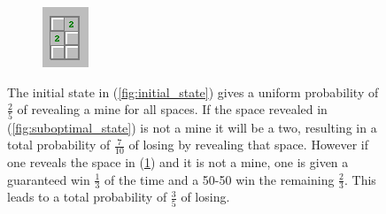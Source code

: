 \documentclass[letterpaper]{article}
\begin{document}
\begin{figure}[t]
\begin{subfigure}[b]{0.3\columnwidth}
	\includegraphics[width=\columnwidth]{tie breaker 3}
	\caption{\label{fig:optimal_state}}
\end{subfigure}
\label{fig:tie_breaker}
\caption{The initial state in (\ref{fig:initial_state}) gives a uniform probability of $\frac25$ of revealing a mine for all spaces.  If the space revealed in (\ref{fig:suboptimal_state}) is not a mine it will be a two, resulting in a total probability of $\frac{7}{10}$ of losing by revealing that space.  However if one reveals the space in (\ref{fig:optimal_state}) and it is not a mine, one is given a guaranteed win $\frac13$ of the time and a 50-50 win the remaining $\frac23$.  This leads to a total probability of $\frac35$ of losing.}
\end{figure}
\end{document}

